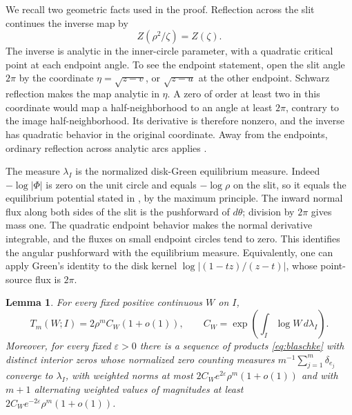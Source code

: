 \documentclass[11pt]{article}
\newtheorem{lemma}[theorem]{Lemma}
\begin{document}
We recall two geometric facts used in the proof. Reflection across the slit
continues the inverse map by
\begin{equation}\label{eq:inverse-reflection}
 Z(\rho^2/\zeta)=Z(\zeta).
\end{equation}
The inverse is analytic in the inner-circle parameter, with a quadratic
critical point at each endpoint angle. To see the endpoint statement,
open the slit angle $2\pi$ by the coordinate $\eta=\sqrt{z-v}$, or
$\sqrt{z-u}$ at the other endpoint. Schwarz reflection makes the map
analytic in $\eta$. A zero of order at least two in this coordinate would
map a half-neighborhood to an angle at least $2\pi$, contrary to the
image half-neighborhood. Its derivative is therefore nonzero, and the
inverse has quadratic behavior in the original coordinate. Away from the
endpoints, ordinary reflection across analytic arcs applies
\cite[Section~7.2]{BN}.

The measure $\lambda_I$ is the normalized disk-Green equilibrium measure.
Indeed $-\log|\Phi|$ is zero on the unit circle and equals $-\log\rho$ on
the slit, so it equals the equilibrium potential stated in
\cite[Section~3]{BPS}, by the maximum principle.
The inward normal flux along both sides of the slit is the pushforward
of $d\theta$; division by $2\pi$ gives mass one. The quadratic endpoint
behavior makes the normal derivative integrable, and the fluxes on small
endpoint circles tend to zero. This identifies the angular pushforward
with the equilibrium measure. Equivalently, one can apply Green's identity
to the disk kernel $\log|(1-tz)/(z-t)|$, whose point-source flux is $2\pi$.

\begin{samepage}
\begin{lemma}\label{lem:weighted}
For every fixed positive continuous $W$ on $I$,
\begin{equation}\label{eq:weighted-minimum}
 T_m(W;I)=2\rho^m C_W(1+o(1)),\qquad
 C_W=\exp\left(\int_I\log W\,d\lambda_I\right).
\end{equation}
Moreover, for every fixed $\varepsilon>0$ there is a sequence of products
\eqref{eq:blaschke} with distinct interior zeros whose normalized zero counting
measures $m^{-1}\sum_{j=1}^m\delta_{e_j}$ converge to $\lambda_I$,
with weighted norms at most
$2C_W e^{2\varepsilon}\rho^m(1+o(1))$ and with $m+1$ alternating weighted
values of magnitudes at least
$2C_W e^{-2\varepsilon}\rho^m(1+o(1))$.
\end{lemma}
\end{samepage}
\end{document}
